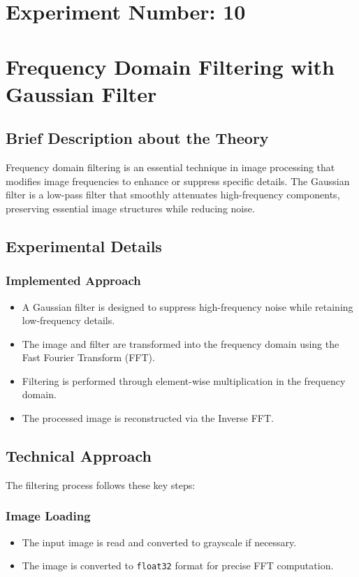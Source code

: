 \documentclass[12pt,a4paper]{article}
\begin{document}
\section*{Experiment Number: 10}
\section{Frequency Domain Filtering with Gaussian Filter}

\subsection{Brief Description about the Theory}
Frequency domain filtering is an essential technique in image processing that modifies image frequencies to enhance or suppress specific details. The Gaussian filter is a low-pass filter that smoothly attenuates high-frequency components, preserving essential image structures while reducing noise.

\subsection{Experimental Details}
\subsubsection{Implemented Approach}
\begin{itemize}
  \item A Gaussian filter is designed to suppress high-frequency noise while retaining low-frequency details.
  \item The image and filter are transformed into the frequency domain using the Fast Fourier Transform (FFT).
  \item Filtering is performed through element-wise multiplication in the frequency domain.
  \item The processed image is reconstructed via the Inverse FFT.
\end{itemize}

\subsection{Technical Approach}
The filtering process follows these key steps:

\subsubsection{Image Loading}
\begin{itemize}
  \item The input image is read and converted to grayscale if necessary.
  \item The image is converted to \texttt{float32} format for precise FFT computation.
\end{itemize}
\end{document}
